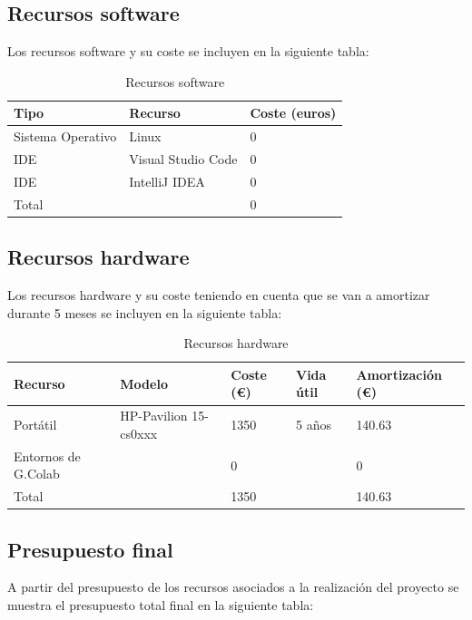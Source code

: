 \subsection{Recursos software}\label{subsec:recursos-software}
Los recursos software y su coste se incluyen en la siguiente tabla:

\begin{table}[H]
    \centering
    \begin{tabular}{|l|l|l|}
        \hline
        \textbf{Tipo} & \textbf{Recurso} & \textbf{Coste (euros)} \\
        \hline
        Sistema Operativo & Linux & 0 \\
        \hline
        IDE & Visual Studio Code & 0 \\
        \hline
        IDE & IntelliJ IDEA & 0 \\
        \hline
        \hline
        Total &  & 0 \\
        \hline
    \end{tabular}
    \caption{Recursos software}
    \label{tab:tabla_recursos_software}
\end{table}

\subsection{Recursos hardware}\label{subsec:recursos-hardware}
Los recursos hardware y su coste teniendo en cuenta que se van a amortizar durante 5 meses
se incluyen en la siguiente tabla:

\begin{table}[H]
    \centering
    \begin{tabular}{|l|l|l|l|l|}
        \hline
        \textbf{Recurso} & \textbf{Modelo} &  \textbf{Coste (€)} & \textbf{Vida útil} & \textbf{Amortización (€)} \\
        \hline
        Portátil & HP-Pavilion 15-cs0xxx & 1350 & 5 años & 140.63 \\
        \hline
        Entornos de G.Colab &  & 0 & & 0 \\
        \hline
        \hline
        Total &  & 1350 &  & 140.63 \\
        \hline
    \end{tabular}
    \caption{Recursos hardware}
    \label{tab:tabla_recursos_hardware}
\end{table}


\subsection{Presupuesto final}\label{subsec:presupuesto-final}
A partir del presupuesto de los recursos asociados a la realización del proyecto se muestra el presupuesto total final
en la siguiente tabla:

